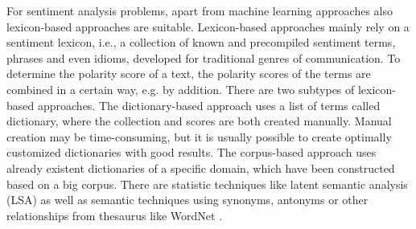 \documentclass[article,type=msc,colorback,accentcolor=tud7b]{tudthesis}
\begin{document}
    For sentiment analysis problems, apart from machine learning approaches also lexicon-based approaches are suitable. Lexicon-based approaches mainly rely on a sentiment lexicon, i.e., a collection of known and precompiled sentiment terms, phrases and even idioms, developed for traditional genres of communication. To determine the polarity score of a text, the polarity scores of the terms are combined in a certain way, e.g. by addition. There are two subtypes of lexicon-based approaches. The dictionary-based approach uses a list of terms called dictionary, where the collection and scores are both created manually. Manual creation may be time-consuming, but it is usually possible to create optimally customized dictionaries with good results. The corpus-based approach uses already existent dictionaries of a specific domain, which have been constructed based on a big corpus. There are statistic techniques like latent semantic analysis (LSA) as well as semantic techniques using synonyms, antonyms or other relationships from thesaurus like WordNet \autocite{Kharde2016}.
\end{document}
